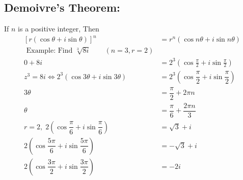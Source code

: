\documentclass{amsart}
\begin{document}
\begin{multicols}{2}
    \subsection*{Demoivre's Theorem:}
    If $n$ is a positive integer, Then
    \begin{align*}
    \left[r\left(\cos\theta+i\sin\theta\right) \right]^n&=r^n\left(\cos n\theta+i\sin n\theta\right) \\ 
    \text{ Example: Find } \sqrt[3]{8i}\qquad\left(n=3,r=2\right)\\ 
    0+8i&=2^{3}\left(\cos\frac{\pi}{2}+i\sin\frac{\pi}{2}\right) \\
    z^3=8i\Leftrightarrow 2^3(\cos3\theta+i\sin3\theta)&=2^{3}\left(\cos\dfrac{\pi}{2}+i\sin\dfrac{\pi}{2}\right) \\ 
    3\theta&=\dfrac{\pi}{2}+2\pi n\\
    \theta&=\dfrac{\pi}{6}+\dfrac{2\pi n}{3} \\
    r=2,\;2\left(\cos\dfrac{\pi}{6}+i\sin\dfrac{\pi}{6}\right)&=\boxed{\sqrt{3}+i} \\
     2\left(\cos\dfrac{5\pi}{6}+i\sin\dfrac{5\pi}{6}\right)&=\boxed{-\sqrt{3}+i} \\
     2\left(\cos\dfrac{3\pi}{2}+i\sin\dfrac{3\pi}{2}\right)&=\boxed{-2i}
\end{align*}
\end{multicols}
\end{document}
